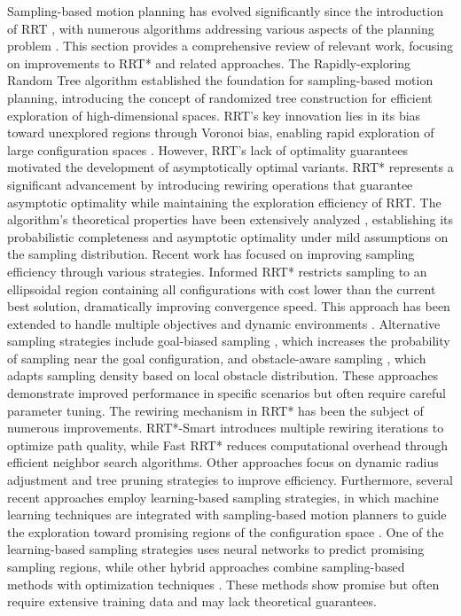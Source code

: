 \documentclass[pdflatex,sn-mathphys-num]{sn-jnl}
\theoremstyle{thmstyleone}%
\theoremstyle{thmstyletwo}%
\theoremstyle{thmstylethree}%
\begin{document}
Sampling-based motion planning has evolved significantly since the introduction of RRT \cite{7}, with numerous algorithms addressing various aspects of the planning problem \cite{17, 18}. This section provides a comprehensive review of relevant work, focusing on improvements to RRT* and related approaches. The Rapidly-exploring Random Tree algorithm \cite{7} established the foundation for sampling-based motion planning, introducing the concept of randomized tree construction for efficient exploration of high-dimensional spaces. RRT's key innovation lies in its bias toward unexplored regions through Voronoi bias, enabling rapid exploration of large configuration spaces \cite{19}. However, RRT's lack of optimality guarantees motivated the development of asymptotically optimal variants. RRT* \cite{8} represents a significant advancement by introducing rewiring operations that guarantee asymptotic optimality while maintaining the exploration efficiency of RRT. The algorithm's theoretical properties have been extensively analyzed \cite{8}, establishing its probabilistic completeness and asymptotic optimality under mild assumptions on the sampling distribution. Recent work has focused on improving sampling efficiency through various strategies. Informed RRT* \cite{14} restricts sampling to an ellipsoidal region containing all configurations with cost lower than the current best solution, dramatically improving convergence speed. This approach has been extended to handle multiple objectives \cite{17} and dynamic environments \cite{18, 20}. Alternative sampling strategies include goal-biased sampling \cite{21}, which increases the probability of sampling near the goal configuration, and obstacle-aware sampling \cite{22}, which adapts sampling density based on local obstacle distribution. These approaches demonstrate improved performance in specific scenarios but often require careful parameter tuning. The rewiring mechanism in RRT* has been the subject of numerous improvements. RRT*-Smart \cite{16} introduces multiple rewiring iterations to optimize path quality, while Fast RRT* \cite{22} reduces computational overhead through efficient neighbor search algorithms. Other approaches focus on dynamic radius adjustment \cite{23} and tree pruning strategies \cite{24} to improve efficiency. Furthermore, several recent approaches employ learning-based sampling strategies, in which machine learning techniques are integrated with sampling-based motion planners to guide the exploration toward promising regions of the configuration space \cite{25, 26}. One of the learning-based sampling strategies \cite{27} uses neural networks to predict promising sampling regions, while other hybrid approaches combine sampling-based methods with optimization techniques \cite{28}. These methods show promise but often require extensive training data and may lack theoretical guarantees.
\end{document}

